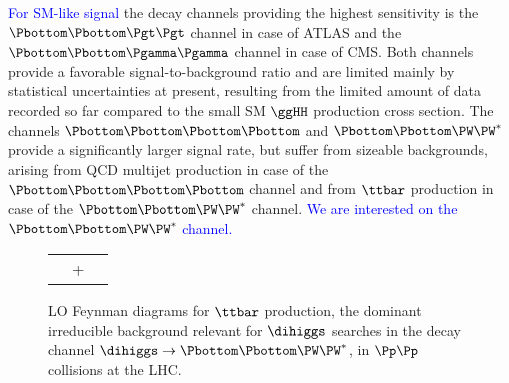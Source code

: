 \textcolor{blue}{For SM-like signal} the decay channels providing the highest sensitivity is the $\Pbottom\Pbottom\Pgt\Pgt$ channel in case of ATLAS and the $\Pbottom\Pbottom\Pgamma\Pgamma$ channel in case of CMS.
Both channels provide a favorable signal-to-background ratio and are limited mainly by statistical uncertainties at present,
resulting from the limited amount of data recorded so far compared to the small SM $\ggHH$ production cross section.
The channels $\Pbottom\Pbottom\Pbottom\Pbottom$ and $\Pbottom\Pbottom\PW\PW^{*}$ provide a significantly larger signal rate,
but suffer from sizeable backgrounds,
arising from QCD multijet production in case of the $\Pbottom\Pbottom\Pbottom\Pbottom$ channel 
and from $\ttbar$ production in case of the $\Pbottom\Pbottom\PW\PW^{*}$ channel. \textcolor{blue}{We are interested on the $\Pbottom\Pbottom\PW\PW^{*}$ channel.  } %
 
\begin{figure}
\setlength{\unitlength}{1mm}
\begin{center}
\begin{tabular}{ccc}
\raisebox{-.45\height}{\resizebox{0.3\textwidth}{!}{}} &
\qquad + &
\raisebox{-.45\height}{\resizebox{0.3\textwidth}{!}{}}
\end{tabular}
\end{center}
\caption{
  LO Feynman diagrams for $\ttbar$ production, the dominant irreducible background relevant for $\dihiggs$ searches in the decay channel $\dihiggs \to \Pbottom\Pbottom\PW\PW^{*}$,
  in $\Pp\Pp$ collisions at the LHC.
}
\label{fig:ttbar_FeynmanDiagram}
\end{figure}

